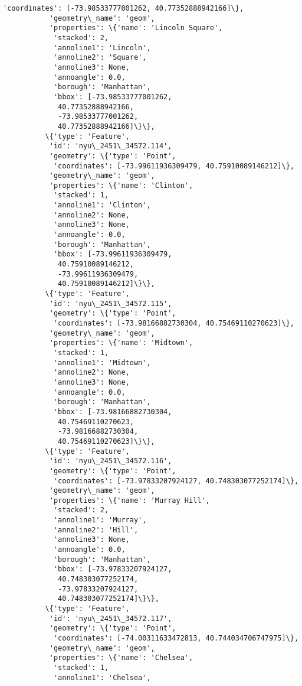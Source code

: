 \documentclass[11pt]{article}
\begin{document}
\begin{Verbatim}[commandchars=\\\{\}]
            'coordinates': [-73.98533777001262, 40.77352888942166]\},
           'geometry\_name': 'geom',
           'properties': \{'name': 'Lincoln Square',
            'stacked': 2,
            'annoline1': 'Lincoln',
            'annoline2': 'Square',
            'annoline3': None,
            'annoangle': 0.0,
            'borough': 'Manhattan',
            'bbox': [-73.98533777001262,
             40.77352888942166,
             -73.98533777001262,
             40.77352888942166]\}\},
          \{'type': 'Feature',
           'id': 'nyu\_2451\_34572.114',
           'geometry': \{'type': 'Point',
            'coordinates': [-73.99611936309479, 40.75910089146212]\},
           'geometry\_name': 'geom',
           'properties': \{'name': 'Clinton',
            'stacked': 1,
            'annoline1': 'Clinton',
            'annoline2': None,
            'annoline3': None,
            'annoangle': 0.0,
            'borough': 'Manhattan',
            'bbox': [-73.99611936309479,
             40.75910089146212,
             -73.99611936309479,
             40.75910089146212]\}\},
          \{'type': 'Feature',
           'id': 'nyu\_2451\_34572.115',
           'geometry': \{'type': 'Point',
            'coordinates': [-73.98166882730304, 40.75469110270623]\},
           'geometry\_name': 'geom',
           'properties': \{'name': 'Midtown',
            'stacked': 1,
            'annoline1': 'Midtown',
            'annoline2': None,
            'annoline3': None,
            'annoangle': 0.0,
            'borough': 'Manhattan',
            'bbox': [-73.98166882730304,
             40.75469110270623,
             -73.98166882730304,
             40.75469110270623]\}\},
          \{'type': 'Feature',
           'id': 'nyu\_2451\_34572.116',
           'geometry': \{'type': 'Point',
            'coordinates': [-73.97833207924127, 40.748303077252174]\},
           'geometry\_name': 'geom',
           'properties': \{'name': 'Murray Hill',
            'stacked': 2,
            'annoline1': 'Murray',
            'annoline2': 'Hill',
            'annoline3': None,
            'annoangle': 0.0,
            'borough': 'Manhattan',
            'bbox': [-73.97833207924127,
             40.748303077252174,
             -73.97833207924127,
             40.748303077252174]\}\},
          \{'type': 'Feature',
           'id': 'nyu\_2451\_34572.117',
           'geometry': \{'type': 'Point',
            'coordinates': [-74.00311633472813, 40.744034706747975]\},
           'geometry\_name': 'geom',
           'properties': \{'name': 'Chelsea',
            'stacked': 1,
            'annoline1': 'Chelsea',

\end{Verbatim}
\end{document}
